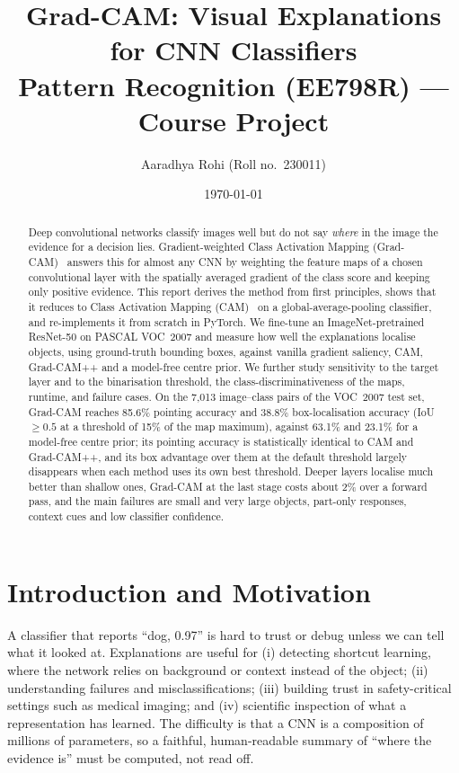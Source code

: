 \documentclass[11pt,a4paper]{article}
\title{\textbf{Grad-CAM: Visual Explanations for CNN Classifiers}\\[2mm]
\large Pattern Recognition (EE798R) --- Course Project}
\author{Aaradhya Rohi \quad (Roll no.\ 230011)}
\date{\today}
\newcommand{\GC}{Grad-CAM}
\begin{document}
\maketitle

\begin{abstract}
Deep convolutional networks classify images well but do not say \emph{where} in the image the evidence for a decision lies.
Gradient-weighted Class Activation Mapping (\GC)~\citep{selvaraju2017} answers this for almost any CNN by weighting the feature maps of a chosen convolutional layer with the spatially averaged gradient of the class score and keeping only positive evidence.
This report derives the method from first principles, shows that it reduces to Class Activation Mapping (CAM)~\citep{zhou2016} on a global-average-pooling classifier, and re-implements it from scratch in PyTorch.
We fine-tune an ImageNet-pretrained ResNet-50 on PASCAL VOC~2007 and measure how well the explanations localise objects, using ground-truth bounding boxes, against vanilla gradient saliency, CAM, Grad-CAM++ and a model-free centre prior.
We further study sensitivity to the target layer and to the binarisation threshold, the class-discriminativeness of the maps, runtime, and failure cases.
On the 7{,}013 image--class pairs of the VOC~2007 test set, \GC{} reaches 85.6\% pointing accuracy and 38.8\% box-localisation accuracy (IoU $\ge0.5$ at a threshold of 15\% of the map maximum), against 63.1\% and 23.1\% for a model-free centre prior; its pointing accuracy is statistically identical to CAM and Grad-CAM++, and its box advantage over them at the default threshold largely disappears when each method uses its own best threshold.
Deeper layers localise much better than shallow ones, \GC{} at the last stage costs about 2\% over a forward pass, and the main failures are small and very large objects, part-only responses, context cues and low classifier confidence.
\end{abstract}

\section{Introduction and Motivation}
A classifier that reports ``dog, 0.97'' is hard to trust or debug unless we can tell what it looked at.
Explanations are useful for (i) detecting shortcut learning, where the network relies on background or context instead of the object; (ii) understanding failures and misclassifications; (iii) building trust in safety-critical settings such as medical imaging; and (iv) scientific inspection of what a representation has learned.
The difficulty is that a CNN is a composition of millions of parameters, so a faithful, human-readable summary of ``where the evidence is'' must be computed, not read off.
\end{document}
